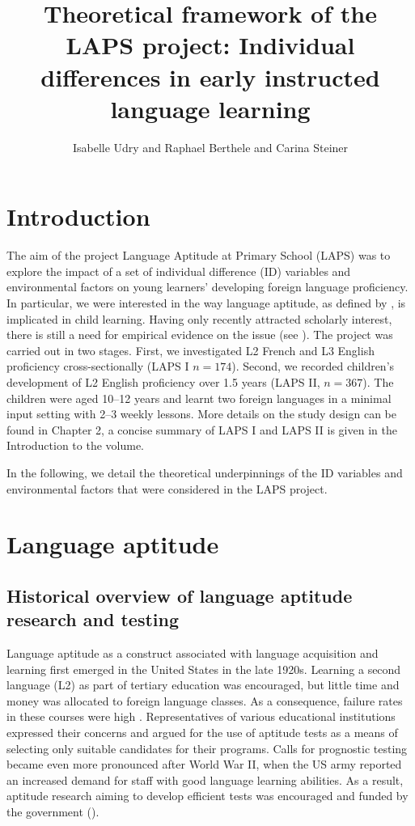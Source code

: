 \documentclass[output=paper]{langscibook}
\author{Isabelle Udry\orcid{}\affiliation{University of Fribourg, Institut de Plurilinguisme; Zurich University of Teacher Education} and Raphael Berthele\orcid{}\affiliation{University of Fribourg, Institut de Plurilinguisme} and Carina Steiner\orcid{}\affiliation{University of Berne, Center for the Study of Language and Society}}
\title[Theoretical framework of the LAPS project]
      {Theoretical framework of the LAPS project: Individual differences in early instructed language learning}
\begin{document}
\maketitle 

\section{Introduction}

The aim of the project Language Aptitude at Primary School (LAPS) was to explore the impact of a set of individual difference (ID) variables and environmental factors on young learners’ developing foreign language proficiency. In particular, we were interested in the way language aptitude, as defined by \citet{Carroll1958}, is implicated in child learning. Having only recently attracted scholarly interest, there is still a need for empirical evidence on the issue (see ). The project was carried out in two stages. First, we investigated L2 French and L3 English proficiency cross-sectionally (LAPS I $n=174$). Second, we recorded children’s development of L2 English proficiency over 1.5 years (LAPS II, $n=367$). The children were aged 10--12 years and learnt two foreign languages in a minimal input setting with 2--3 weekly lessons. More details on the study design can be found in Chapter 2, a concise summary of LAPS I and LAPS II is given in the Introduction to the volume. 

In the following, we detail the theoretical underpinnings of the ID variables and environmental factors that were considered in the LAPS project. 

\section{Language aptitude}
\subsection{Historical overview of language aptitude research and testing} %

Language aptitude as a construct associated with language acquisition and learning first emerged in the United States in the late 1920s. Learning a second language (L2) as part of tertiary education was encouraged, but little time and money was allocated to foreign language classes. As a consequence, failure rates in these courses were high \citep{Spolsky1995}. Representatives of various educational institutions expressed their concerns and argued for the use of aptitude tests as a means of selecting only suitable candidates for their programs. Calls for prognostic testing became even more pronounced after World War II, when the US army reported an increased demand for staff with good language learning abilities. As a result, aptitude research aiming to develop efficient tests was encouraged and funded by the government (\citealt{StansfieldReed2004}). 
\end{document}
